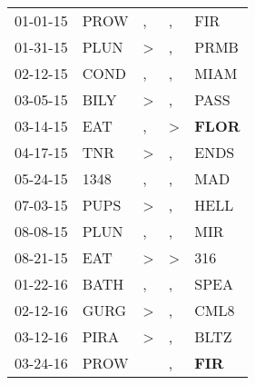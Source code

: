 \begin{supertabular}{p{0.07\textwidth}p{0.06\textwidth}p{0.02\textwidth}p{0.02\textwidth}p{0.06\textwidth}}
          01-01-15\textsuperscript{} &           PROW\textsuperscript{} &                , &                , &            FIR\textsuperscript{} \\
          01-31-15\textsuperscript{} &           PLUN\textsuperscript{} &     \textgreater &                , &           PRMB\textsuperscript{} \\
          02-12-15\textsuperscript{} &           COND\textsuperscript{} &                , &                , &           MIAM\textsuperscript{} \\
          03-05-15\textsuperscript{} &           BILY\textsuperscript{} &     \textgreater &                , &           PASS\textsuperscript{} \\
          03-14-15\textsuperscript{} &            EAT\textsuperscript{} &                , &     \textgreater &  \textbf{FLOR\textsuperscript{}} \\
          04-17-15\textsuperscript{} &            TNR\textsuperscript{} &     \textgreater &                , &           ENDS\textsuperscript{} \\
          05-24-15\textsuperscript{} &           1348\textsuperscript{} &                , &                , &            MAD\textsuperscript{} \\
          07-03-15\textsuperscript{} &           PUPS\textsuperscript{} &     \textgreater &                , &           HELL\textsuperscript{} \\
          08-08-15\textsuperscript{} &           PLUN\textsuperscript{} &                , &                , &            MIR\textsuperscript{} \\
          08-21-15\textsuperscript{} &            EAT\textsuperscript{} &     \textgreater &     \textgreater &            316\textsuperscript{} \\
          01-22-16\textsuperscript{} &           BATH\textsuperscript{} &                , &                , &           SPEA\textsuperscript{} \\
          02-12-16\textsuperscript{} &           GURG\textsuperscript{} &     \textgreater &                , &           CML8\textsuperscript{} \\
          03-12-16\textsuperscript{} &           PIRA\textsuperscript{} &     \textgreater &                , &           BLTZ\textsuperscript{} \\
          03-24-16\textsuperscript{} &           PROW\textsuperscript{} &                  &                , &   \textbf{FIR\textsuperscript{}} \\

\end{supertabular}
